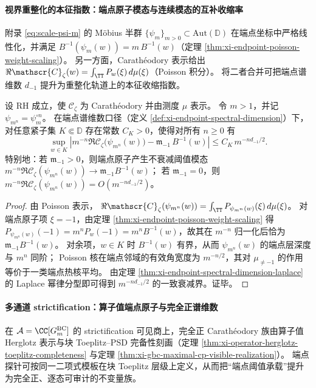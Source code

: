\paragraph{视界重整化的本征指数：端点原子模态与连续模态的互补收缩率}
附录 \eqref{eq:scale-psi-m} 的 Möbius 半群 \(\{\psi_m\}_{m>0}\subset\mathrm{Aut}(\mathbb{D})\) 在端点坐标中严格线性化，并满足
\(B^{-1}(\psi_m(w))=m\,B^{-1}(w)\)（定理 \ref{thm:xi-endpoint-poisson-weight-scaling}）。
另一方面，Carath\'eodory 表示给出 \(\Re \mathscr{C}_{\zeta}(w)=\int_{\TT}P_w(\xi)\,d\mu(\xi)\)（Poisson 积分）。
将二者合并可把端点谱维数 \(d_{-1}\) 提升为重整化轨道上的本征收缩指数。

\begin{theorem}[端点连续谱的重整化指数]\label{thm:xi-endpoint-renormalization-index}
设 RH 成立，使 \(\mathscr{C}_{\zeta}\) 为 Carath\'eodory 并由测度 \(\mu\) 表示。
令 \(m>1\)，并记 \(\psi_{m^n}=\psi_m^{\circ n}\)。
在端点谱维数口径（定义 \ref{def:xi-endpoint-spectral-dimension}）下，对任意紧子集 \(K\Subset\mathbb{D}\) 存在常数 \(C_K>0\)，使得对所有 \(n\ge 0\) 有
\[
\sup_{w\in K}\left|
m^{-n}\Re \mathscr{C}_{\zeta}\!\bigl(\psi_{m^n}(w)\bigr)
-\mathfrak m_{-1}\,B^{-1}(w)
\right|
\le C_K\,m^{-n d_{-1}/2}.
\]
特别地：若 \(\mathfrak m_{-1}>0\)，则端点原子产生不衰减阈值模态
\(
m^{-n}\Re \mathscr{C}_{\zeta}(\psi_{m^n}(w))\to \mathfrak m_{-1}B^{-1}(w)
\)；
若 \(\mathfrak m_{-1}=0\)，则 \(m^{-n}\Re \mathscr{C}_{\zeta}(\psi_{m^n}(w))=O(m^{-n d_{-1}/2})\)。
\end{theorem}

\begin{proof}
由 Poisson 表示，
\(
\Re \mathscr{C}_{\zeta}(\psi_{m^n}(w))
=\int_{\TT}P_{\psi_{m^n}(w)}(\xi)\,d\mu(\xi)
\)。
对端点原子项 \(\xi=-1\)，由定理 \ref{thm:xi-endpoint-poisson-weight-scaling} 得
\(
P_{\psi_{m^n}(w)}(-1)=m^n P_w(-1)=m^n B^{-1}(w)
\)，故其在 \(m^{-n}\) 归一化后恰为 \(\mathfrak m_{-1}B^{-1}(w)\)。
对余项，\(w\in K\) 时 \(B^{-1}(w)\) 有界，从而 \(\psi_{m^n}(w)\) 的端点层深度与 \(m^n\) 同阶；
Poisson 核在端点邻域的有效角宽度为 \(m^{-n/2}\)，其对 \(\mu_{\neq-1}\) 的作用等价于一类端点热核平均。
由定理 \ref{thm:xi-endpoint-spectral-dimension-laplace} 的 Laplace 幂律分型即可得到 \(m^{-n d_{-1}/2}\) 的一致衰减界。证毕。
\end{proof}

\paragraph{多通道 strictification：算子值端点原子与完全正谱维数}
在 \(\mathcal{A}=\CC[G^{\mathrm{BC}}_m]\) 的 strictification 可见商上，完全正 Carath\'eodory 族由算子值 Herglotz 表示与块 Toeplitz--PSD 完备性刻画（定理 \ref{thm:xi-operator-herglotz-toeplitz-completeness} 与定理 \ref{thm:xi-gbc-maximal-cp-visible-realization}）。
端点探针可按同一二项式模板在块 Toeplitz 层级上定义，从而把“端点阈值承载”提升为完全正、逐态可审计的不变量族。

